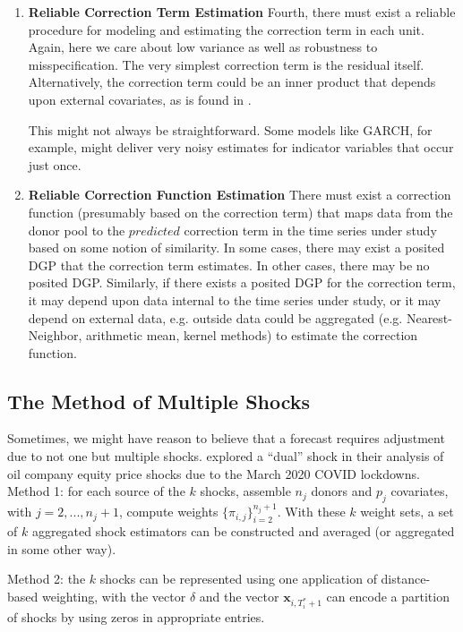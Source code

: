 \documentclass[11pt]{article}
\newcommand{\x}{\textbf{x}}
\theoremstyle{definition}
\begin{document}
\begin{enumerate}
\item \textbf{Reliable Correction Term Estimation} Fourth, there must exist a reliable procedure for modeling and estimating the correction term in each unit.  Again, here we care about low variance as well as robustness to misspecification.  The very simplest correction term is the residual itself.  Alternatively, the correction term could be an inner product that depends upon external covariates, as is found in \cite{lin2021minimizing,lundquist2024volatility}.

This might not always be straightforward.  Some models like GARCH, for example, might deliver very noisy estimates for indicator variables that occur just once.

\item \textbf{Reliable Correction Function Estimation} There must exist a correction function (presumably based on the correction term) that maps data from the donor pool to the $\textit{predicted}$ correction term in the time series under study based on some notion of similarity.  In some cases, there may exist a posited DGP that the correction term estimates.  In other cases, there may be no posited DGP.  Similarly, if there exists a posited DGP for the correction term, it may depend upon data internal to the time series under study, or it may depend on external data, e.g. outside data could be aggregated (e.g. Nearest-Neighbor, arithmetic mean, kernel methods) to estimate the correction function.

\end{enumerate}

\subsection{The Method of Multiple Shocks}

Sometimes, we might have reason to believe that a forecast requires adjustment due to not one but multiple shocks.  \cite{lin2021minimizing} explored a ``dual'' shock in their analysis of oil company equity price shocks due to the March 2020 COVID lockdowns.  \\

Method 1: for each source of the $k$ shocks, assemble $n_{j}$ donors and $p_{j}$ covariates, with $j=2,...,n_{j}+1$, compute weights $\{\pi_{i,j}\}^{n_{j}+1}_{i=2}$.  With these $k$ weight sets, a set of $k$ aggregated shock estimators can be constructed and averaged (or aggregated in some other way).

Method 2: the $k$ shocks can be represented using one application of distance-based weighting, with the vector $\delta$ and the vector $\x_{i,T^{*}_{i}+1}$ can encode a partition of shocks by using zeros in appropriate entries.
\end{document}
